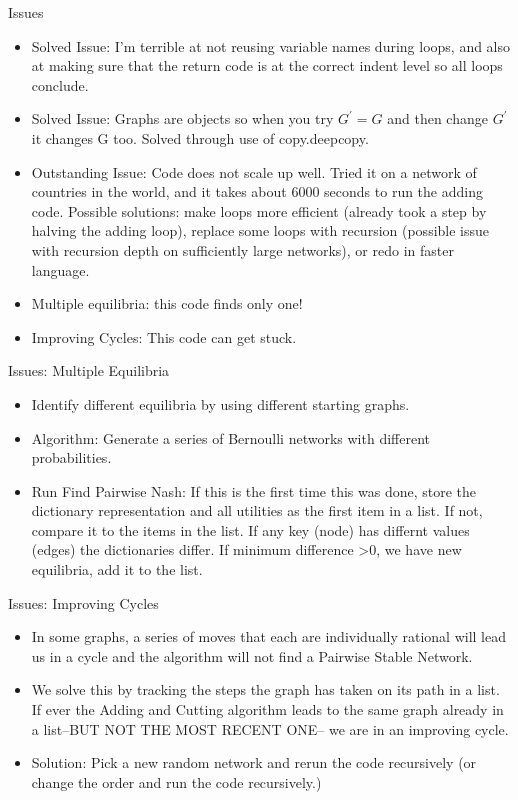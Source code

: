 \documentclass{beamer}
\begin{document}
\begin{frame}{Issues}
\begin{itemize}
\item Solved Issue: I'm terrible at not reusing variable names during loops, and also at making sure that the return code is at the correct indent level so all loops conclude.
\item Solved Issue: Graphs are objects so when you try $G^{'} = G$ and then change $G^{'}$ it changes G too. Solved through use of copy.deepcopy.
\item Outstanding Issue: Code does not scale up well. Tried it on a network of countries in the world, and it takes about 6000 seconds to run the adding code. Possible solutions: make loops more efficient (already took a step by halving the adding loop), replace some loops with recursion (possible issue with recursion depth on sufficiently large networks), or redo in faster language.
\item Multiple equilibria: this code finds only one!
\item Improving Cycles: This code can get stuck.
\end{itemize}
\end{frame}

\begin{frame}{Issues: Multiple Equilibria}
\begin{itemize}
\item Identify different equilibria by using different starting graphs.
\item Algorithm: Generate a series of Bernoulli networks with different probabilities.
\item Run Find Pairwise Nash: If this is the first time this was done, store the dictionary representation and all utilities as the first item in a list. If not, compare it to the items in the list. If any key (node) has differnt values (edges) the dictionaries differ. If minimum difference >0, we have new equilibria, add it to the list.
\end{itemize}
\end{frame}

\begin{frame}{Issues: Improving Cycles}
\begin{itemize}
\item In some graphs, a series of moves that each are individually rational will lead us in a cycle and the algorithm will not find a Pairwise Stable Network.
\item We solve this by tracking the steps the graph has taken on its path in a list. If ever the Adding and Cutting algorithm leads to the same graph already in a list--BUT NOT THE MOST RECENT ONE-- we are in an improving cycle.
\item Solution: Pick a new random network and rerun the code recursively (or change the order and run the code recursively.)
\end{itemize}
\end{frame}
\end{document}
